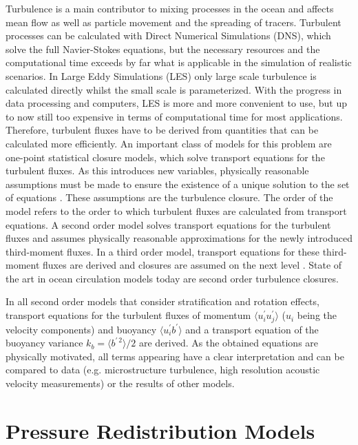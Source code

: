 Turbulence is a main contributor to mixing processes in the ocean and affects mean flow as well as particle movement and the spreading of tracers. Turbulent processes can be calculated with Direct Numerical Simulations (DNS), which solve the full Navier-Stokes equations, but the necessary resources and the computational time exceeds by far what is applicable in the simulation of realistic scenarios. In Large Eddy Simulations (LES) only large scale turbulence is calculated directly whilst the small scale is parameterized. With the progress in data processing and computers, LES is more and more convenient to use, but up to now still too expensive in terms of computational time for most applications. Therefore, turbulent fluxes have to be derived from quantities that can be calculated more efficiently. An important class of models for this problem are one-point statistical closure models, which solve transport equations for the turbulent fluxes. As this introduces new variables, physically reasonable assumptions must be made to ensure the existence of a unique solution to the set of equations \citep[][]{UmlaufBurchard2005a}. These assumptions are the turbulence closure. The order of the model refers to the order to which turbulent fluxes are calculated from transport equations. A second order model solves transport equations for the turbulent fluxes and assumes physically reasonable approximations for the newly introduced third-moment fluxes. In a third order model, transport equations for these third-moment fluxes are derived and closures are assumed on the next level \citep[e.g. in][]{sander1998}. State of the art in ocean circulation models today are second order turbulence closures.

In all second order models that consider stratification and rotation effects, transport equations for the turbulent fluxes of momentum $\langle u_i^\prime u_j^\prime \rangle$ ($u_i$ being the velocity components) and buoyancy $\langle u_i^\prime b^\prime \rangle$ and a transport equation of the buoyancy variance $k_b = \langle b^{\prime \, 2} \rangle \slash 2 $ are derived. As the obtained equations are physically motivated, all terms appearing have a clear interpretation and can be compared to data (e.g. microstructure turbulence, high resolution acoustic velocity measurements) or the results of other models. 

\section{Pressure Redistribution Models}

